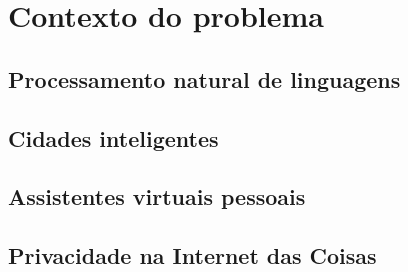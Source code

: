 \chapter{Contexto do problema}

\section{Processamento natural de linguagens}
\section{Cidades inteligentes}
\section{Assistentes virtuais pessoais}
\section{Privacidade na Internet das Coisas}